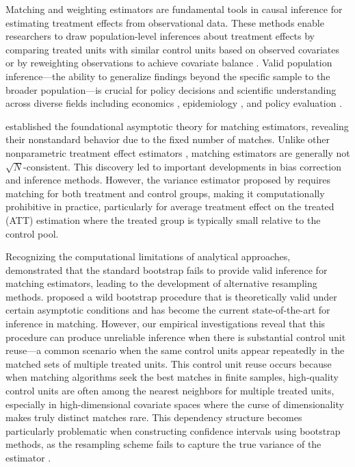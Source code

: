 \documentclass{mytemplate}
\begin{document}
Matching and weighting estimators are fundamental tools in causal inference for estimating treatment effects from observational data. These methods enable researchers to draw population-level inferences about treatment effects by comparing treated units with similar control units based on observed covariates \citep{rosenbaum1983central, rubin1973matching} or by reweighting observations to achieve covariate balance \citep{hirano2003efficient, imbens2004nonparametric}. Valid population inference—the ability to generalize findings beyond the specific sample to the broader population—is crucial for policy decisions and scientific understanding across diverse fields including economics \citep{dehejia1999causal, heckman1997matching}, epidemiology \citep{stuart2010matching}, and policy evaluation \citep{smith2005does}.

\cite{abadie2006large} established the foundational asymptotic theory for matching estimators, revealing their nonstandard behavior due to the fixed number of matches. Unlike other nonparametric treatment effect estimators \citep{heckman1998matching, hirano2003efficient}, matching estimators are generally not $\sqrt{N}$-consistent. This discovery led to important developments in bias correction \citep{abadie2011bias} and inference methods. However, the variance estimator proposed by \cite{abadie2006large} requires matching for both treatment and control groups, making it computationally prohibitive in practice, particularly for average treatment effect on the treated (ATT) estimation where the treated group is typically small relative to the control pool.

Recognizing the computational limitations of analytical approaches, \cite{abadie2008failure} demonstrated that the standard bootstrap fails to provide valid inference for matching estimators, leading to the development of alternative resampling methods. \cite{otsu2017bootstrap} proposed a wild bootstrap procedure that is theoretically valid under certain asymptotic conditions and has become the current state-of-the-art for inference in matching. However, our empirical investigations reveal that this procedure can produce unreliable inference when there is substantial control unit reuse—a common scenario when the same control units appear repeatedly in the matched sets of multiple treated units. This control unit reuse occurs because when matching algorithms seek the best matches in finite samples, high-quality control units are often among the nearest neighbors for multiple treated units, especially in high-dimensional covariate spaces where the curse of dimensionality makes truly distinct matches rare. This dependency structure becomes particularly problematic when constructing confidence intervals using bootstrap methods, as the resampling scheme fails to capture the true variance of the estimator \citep{abadie2012martingale}.
\end{document}
